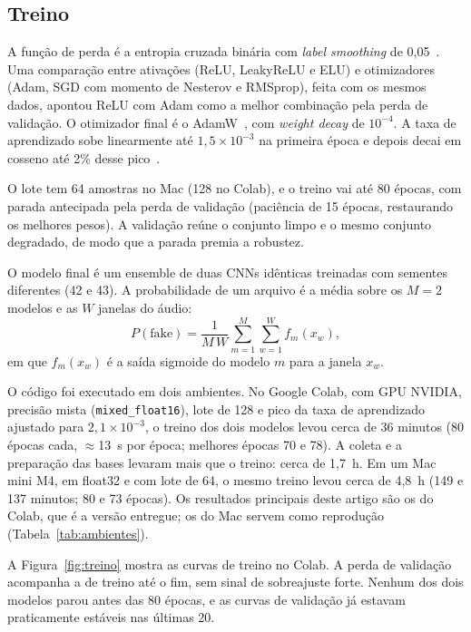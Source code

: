 \subsection{Treino}

A função de perda é a entropia cruzada binária com \textit{label smoothing} de 0,05~\citep{szegedy2016inception}. Uma comparação entre ativações (ReLU, LeakyReLU e ELU) e otimizadores (Adam, SGD com momento de Nesterov e RMSprop), feita com os mesmos dados, apontou ReLU com Adam como a melhor combinação pela perda de validação. O otimizador final é o AdamW~\citep{kingma2015adam,loshchilov2019adamw}, com \textit{weight decay} de $10^{-4}$. A taxa de aprendizado sobe linearmente até $1{,}5 \times 10^{-3}$ na primeira época e depois decai em cosseno até 2\% desse pico~\citep{loshchilov2017sgdr}.

O lote tem 64 amostras no Mac (128 no Colab), e o treino vai até 80 épocas, com parada antecipada pela perda de validação (paciência de 15 épocas, restaurando os melhores pesos). A validação reúne o conjunto limpo e o mesmo conjunto degradado, de modo que a parada premia a robustez.

O modelo final é um ensemble de duas CNNs idênticas treinadas com sementes diferentes (42 e 43). A probabilidade de um arquivo é a média sobre os $M=2$ modelos e as $W$ janelas do áudio:
\begin{equation}\label{eq:pfake}
P(\text{fake}) = \frac{1}{M\,W}\sum_{m=1}^{M}\sum_{w=1}^{W} f_m(x_w),
\end{equation}
em que $f_m(x_w)$ é a saída sigmoide do modelo $m$ para a janela $x_w$.

O código foi executado em dois ambientes. No Google Colab, com GPU NVIDIA, precisão mista (\texttt{mixed\_float16}), lote de 128 e pico da taxa de aprendizado ajustado para $2{,}1 \times 10^{-3}$, o treino dos dois modelos levou cerca de 36 minutos (80 épocas cada, $\approx$13~s por época; melhores épocas 70 e 78). A coleta e a preparação das bases levaram mais que o treino: cerca de 1,7~h. Em um Mac mini M4, em float32 e com lote de 64, o mesmo treino levou cerca de 4,8~h (149 e 137 minutos; 80 e 73 épocas). Os resultados principais deste artigo são os do Colab, que é a versão entregue; os do Mac servem como reprodução (Tabela~\ref{tab:ambientes}).

A Figura~\ref{fig:treino} mostra as curvas de treino no Colab. A perda de validação acompanha a de treino até o fim, sem sinal de sobreajuste forte. Nenhum dos dois modelos parou antes das 80 épocas, e as curvas de validação já estavam praticamente estáveis nas últimas 20.

